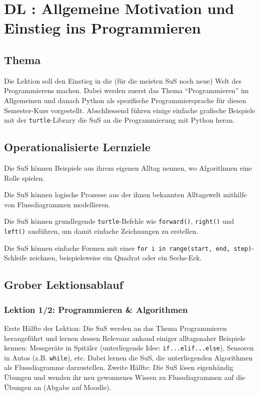 \section{DL \themycounter: Allgemeine Motivation und Einstieg ins Programmieren}
\begin{myExBox}[title=DL \themycounter]
\subsection*{Thema}
Die Lektion soll den Einstieg in die (für die meisten SuS noch neue) Welt des Programmierens machen. Dabei werden zuerst das Thema ``Programmieren'' im Allgemeinen und danach Python als spezifische Programmiersprache für diesen Semester-Kurs vorgestellt. Abschliessend führen einige einfache grafische Beispiele mit der \lstinline|turtle|-Library die SuS an die Programmierung mit Python heran.


\subsection*{Operationalisierte Lernziele}
\begin{todolist}
    \item Die SuS können Beispiele aus ihrem eigenen Alltag nennen, wo Algorithmen eine Rolle spielen.
    \item Die SuS können logische Prozesse aus der ihnen bekannten Alltagswelt mithilfe von Flussdiagrammen modellieren.
    \item Die SuS können grundlegende \lstinline|turtle|-Befehle wie \lstinline|forward()|, \lstinline|right()| und \lstinline|left()| ausführen, um damit einfache Zeichnungen zu erstellen.
    \item Die SuS können einfache Formen mit einer \lstinline|for i in range(start, end, step)|-Schleife zeichnen, beispielsweise ein Quadrat oder ein Sechs-Eck.
\end{todolist}

\subsection*{Grober Lektionsablauf}
\subsubsection*{Lektion 1/2: Programmieren \& Algorithmen}
Erste Hälfte der Lektion: Die SuS werden an das Thema Programmieren herangeführt und lernen dessen Relevanz anhand einiger alltagsnaher Beispiele kennen: Messgeräte in Spitäler (unterliegende Idee: \lstinline|if...elif...else|), Sensoren in Autos (z.B. \lstinline|while|), etc. Dabei lernen die SuS, die unterliegenden Algorithmen als Flussdiagramme darzustellen. Zweite Hälfte: Die SuS lösen eigenhändig Übungen und wenden ihr neu gewonnenes Wissen zu Flussdiagrammen auf die Übungen an (Abgabe auf Moodle).


\end{myExBox}
